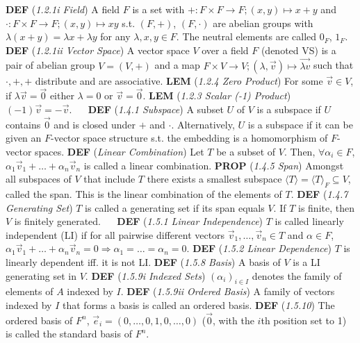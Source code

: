 \documentclass{article}
\newcommand{\wde}[1]{\textcolor{defc}{\textbf{DEF}} (\textcolor{namec}{\textit{#1}})}
\newcommand{\wl}[1]{\textcolor{lemc}{\textbf{LEM}} (\textcolor{namec}{\textit{#1}})}
\newcommand{\wpr}[1]{\textcolor{propc}{\textbf{PROP}} (\textcolor{namec}{\textit{#1}})}
\begin{document}
\begin{multicols}{2}

  \noindent %
  \wde{1.2.1i Field} A field $F$ is a set with $+ : F \times F \to F; (x, y) \mapsto x + y$ and $\cdot : F \times F \to F; (x, y) \mapsto xy$ s.t. $(F,+)$, $(F,\cdot)$ are abelian groups with $\lambda(x + y) = \lambda x + \lambda y$  for any $\lambda, x, y \in F$. The neutral elements are called $0_{F}$, $1_{F}$.
  \wde{1.2.1ii Vector Space} A vector space $V$ over a field $F$ (denoted VS) is a pair of abelian group $V=(V, +)$ and a map $F \times V \to V; (\lambda, \vec{v}) \mapsto \vec{\lambda v}$ such that $\cdot,+,+$ distribute and are associative.
  \wl{1.2.4 Zero Product} For some $\vec{v} \in V$, if $\lambda\vec{v} = \vec{0}$ either $\lambda=0$ or $\vec{v}=\vec{0}$.
  \wl{1.2.3 Scalar (-1) Product} $(-1)\vec{v} = -\vec{v}$.
\ \
  \noindent %
  \wde{1.4.1 Subspace} A subset $U$ of $V$ is a subspace if $U$ contains $\vec{0}$ and is closed under $+$ and $\cdot$. Alternatively, $U$ is a subspace if it can be given an $F$-vector space structure s.t. the embedding is a homomorphism of $F$-vector spaces.
  \wde{Linear Combination} Let $T$ be a subset of $V$. Then, $\forall \alpha_{i} \in F$, $\alpha_{1}\vec{v}_{1} + \dots + \alpha_{n}\vec{v}_{n}$ is called a linear combination.
  \wpr{1.4.5 Span} Amongst all subspaces of $V$ that include $T$ there exists a smallest subspace $\langle T \rangle = \langle T \rangle_{F} \subseteq V$, called the span. This is the linear combination of the elements of $T$.
  \wde{1.4.7 Generating Set} $T$ is called a generating set if its span equals $V$. If $T$ is finite, then $V$ is finitely generated.
\ \
  \noindent %
  \wde{1.5.1 Linear Independence} $T$ is called linearly independent (LI) if for all pairwise different vectors $\vec{v}_{1},\dots,\vec{v}_{n} \in T$ and $\alpha \in F$, $\alpha_{1}\vec{v}_{1} + \dots + \alpha_{n}\vec{v}_{n} = 0 \Rightarrow \alpha_{1} = \dots = \alpha_{n} = 0$.
  \wde{1.5.2 Linear Dependence} $T$ is linearly dependent iff. it is not LI.
  \wde{1.5.8 Basis} A basis of $V$ is a LI generating set in $V$.
  \wde{1.5.9i Indexed Sets} $(\alpha_{i})_{i \in I}$ denotes the family of elements of $A$ indexed by $I$.
  \wde{1.5.9ii Ordered Basis} A family of vectors indexed by $I$ that forms a basis is called an ordered basis.
  \wde{1.5.10} The ordered basis of $F^{n}$, $\vec{e}_{i} = (0,\dots,0,1,0,\dots,0)$ ($\vec{0}$, with the $i$th position set to 1) is called the standard basis of $F^{n}$.

\end{multicols}
\end{document}
